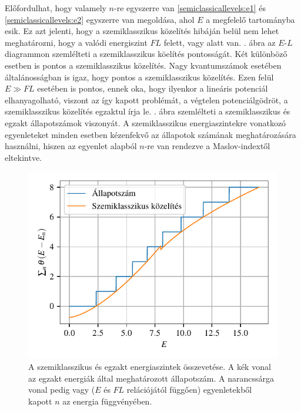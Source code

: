 Előfordulhat, hogy valamely $n$-re egyszerre van \eqref{semiclassicallevels:e1} és \eqref{semiclassicallevels:e2} egyszerre van megoldása, ahol $E$ a megfelelő tartományba esik. Ez azt jelenti, hogy a szemiklasszikus közelítés hibáján belül nem lehet meghatározni, hogy a valódi energiszint $FL$ felett, vagy alatt van. . ábra az $E$-$L$ diagrammon szemlélteti a szemiklasszikus köelítés pontosságát. Két különböző esetben is pontos a szemiklasszikus közelítés. Nagy kvantumszámok esetében általánosságban is igaz, hogy pontos a szemiklasszikus közelítés. Ezen felül $E\gg FL$ esetében is pontos, ennek oka, hogy ilyenkor a lineáris potenciál elhanyagolható, viszont az így kapott problémát, a végtelen potenciálgödröt, a szemiklasszikus közelítés egzaktul írja le. . ábra szemlélteti a szemiklasszikus és egzakt állapotszámok viszonyát. A szemiklasszikus energiaszintekre vonatkozó egyenleteket minden esetben kézenfekvő az állapotok számának meghatározására használni, hiszen az egyenlet alapból $n$-re van rendezve a Maslov-indextől eltekintve. 
\begin{figure}[H]
	\centering
	\includegraphics[scale=1]{./figs/allapotszam.pdf}
	\caption[Szemiklasszikus állapotszám]{A szemiklasszikus és egzakt energiaszintek összevetése. A kék vonal az egzakt energiák által meghatározott állapotszám. A narancssárga vonal pedig  vagy  ($E$ és $FL$ relációjától függően) egyenletekből kapott $n$ az energia függvényében.}
	\label{semiclassicallevels:allapotszam}
\end{figure}
